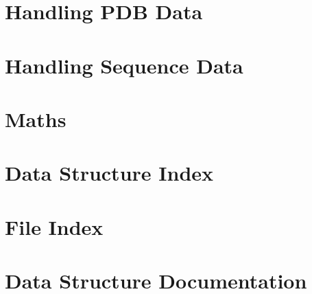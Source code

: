 \documentclass[twoside]{book}
\begin{document}
\chapter{Handling P\-D\-B Data}
\label{page_08}
\hypertarget{page_08}{}

\chapter{Handling Sequence Data}
\label{page_09}
\hypertarget{page_09}{}

\chapter{Maths}
\label{page_10}
\hypertarget{page_10}{}

\chapter{Data Structure Index}

\chapter{File Index}

\chapter{Data Structure Documentation}































\end{document}
